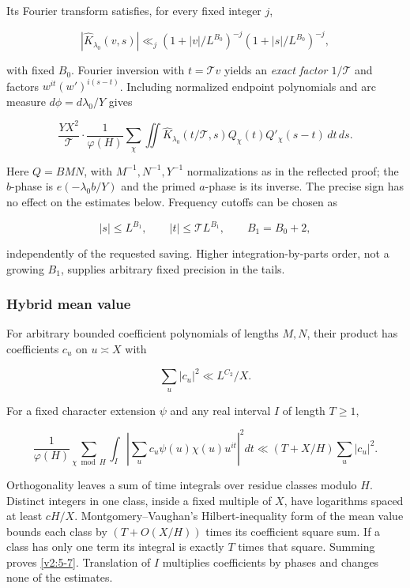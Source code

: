 \documentclass[11pt]{article}
\theoremstyle{definition}
\theoremstyle{remark}
\numberwithin{equation}{section}
\begin{document}
Its Fourier transform satisfies, for every fixed integer $j$,


\begin{equation}\label{v2:5-4}
|\widehat K_{\lambda_0}(v,s)|\ll_j
(1+|v|/L^{B_0})^{-j}(1+|s|/L^{B_0})^{-j},
\end{equation}


with fixed $B_0$. Fourier inversion with $t=\mathcal T v$ yields an \emph{exact factor $1/\mathcal T$} and factors $w^{it}(w')^{i(s-t)}$. Including normalized endpoint polynomials and arc measure $d\phi=d\lambda_0/Y$ gives


\begin{equation}\label{v2:5-5}
\frac{YX^2}{\mathcal T}\cdot
\frac1{\varphi(H)}\sum_\chi
\iint\widehat K_{\lambda_0}(t/\mathcal T,s)
Q_\chi(t)Q'_\chi(s-t)\,dt\,ds.
\end{equation}


Here $Q=BMN$, with $M^{-1},N^{-1},Y^{-1}$ normalizations as in the reflected proof; the $b$-phase is $e(-\lambda_0b/Y)$ and the primed $a$-phase is its inverse. The precise sign has no effect on the estimates below. Frequency cutoffs can be chosen as


\begin{equation}\label{v2:5-6}
|s|\le L^{B_1},\qquad |t|\le\mathcal T L^{B_1},\qquad B_1=B_0+2,
\end{equation}


independently of the requested saving. Higher integration-by-parts order, not a growing $B_1$, supplies arbitrary fixed precision in the tails.

\subsubsection{Hybrid mean value}
For arbitrary bounded coefficient polynomials of lengths $M,N$, their product has coefficients $c_u$ on $u\asymp X$ with


\begin{equation}
\sum_u|c_u|^2\ll L^{C_2}/X.
\end{equation}


For a fixed character extension $\psi$ and any real interval $I$ of length $T\ge1$,


\begin{equation}\label{v2:5-7}
\frac1{\varphi(H)}\sum_{\chi\bmod H}
\int_I\left|\sum_u c_u\psi(u)\chi(u)u^{it}\right|^2dt
\ll (T+X/H)\sum_u|c_u|^2.
\end{equation}


Orthogonality leaves a sum of time integrals over residue classes modulo $H$. Distinct integers in one class, inside a fixed multiple of $X$, have logarithms spaced at least $cH/X$. Montgomery–Vaughan's Hilbert-inequality form of the mean value bounds each class by $(T+O(X/H))$ times its coefficient square sum. If a class has only one term its integral is exactly $T$ times that square. Summing proves \eqref{v2:5-7}. Translation of $I$ multiplies coefficients by phases and changes none of the estimates.
\end{document}
